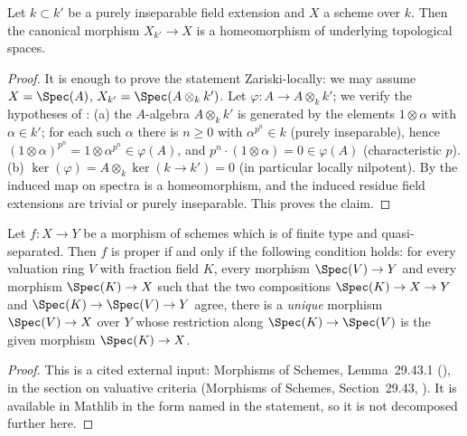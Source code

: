 \begin{lemma}
\label{lem:pc-homeo-pure-insep}
Let $k\subset k'$ be a purely inseparable field extension and $X$ a
scheme over $k$.  Then the canonical morphism $X_{k'}\to X$ is a
homeomorphism of underlying topological spaces.
\end{lemma}
\begin{proof}
It is enough to prove the statement Zariski-locally: we may assume
$X=\Spec(A)$, $X_{k'}=\Spec(A\otimes_kk')$.  Let $\varphi:A\to
A\otimes_kk'$; we verify the hypotheses of
: (a) the
$A$-algebra $A\otimes_kk'$ is generated by the elements
$1\otimes\alpha$ with $\alpha\in k'$; for each such $\alpha$ there is
$n\ge0$ with $\alpha^{p^n}\in k$ (purely inseparable), hence
$(1\otimes\alpha)^{p^n}=1\otimes\alpha^{p^n}\in\varphi(A)$, and
$p^n\cdot(1\otimes\alpha)=0\in\varphi(A)$ (characteristic $p$).  (b)
$\ker(\varphi)=A\otimes_k\ker(k\to k')=0$ (in particular locally
nilpotent).
By  the induced map on spectra is a
homeomorphism, and the induced residue field extensions are trivial or
purely inseparable.
This proves the claim.
\end{proof}

\begin{lemma}
\label{lem:pc-valuative-criterion-proper}
Let $f:X\to Y$ be a morphism of schemes which is of finite type and
quasi-separated.  Then $f$ is proper if and only if the following
condition holds: for every valuation ring $V$ with fraction field $K$,
every morphism $\Spec(V)\to Y$ and every morphism $\Spec(K)\to X$ such
that the two compositions $\Spec(K)\to X\to Y$ and
$\Spec(K)\to\Spec(V)\to Y$ agree, there is a \emph{unique} morphism
$\Spec(V)\to X$ over $Y$ whose restriction along
$\Spec(K)\to\Spec(V)$ is the given morphism $\Spec(K)\to X$.
\mathlibok\ 
\end{lemma}
\begin{proof}
This is a cited external input: Morphisms of Schemes, Lemma~29.43.1
(), in the section on valuative criteria
(Morphisms of Schemes, Section~29.43, ).  It is
available in Mathlib in the form named in the statement, so it is not
decomposed further here.
\end{proof}

